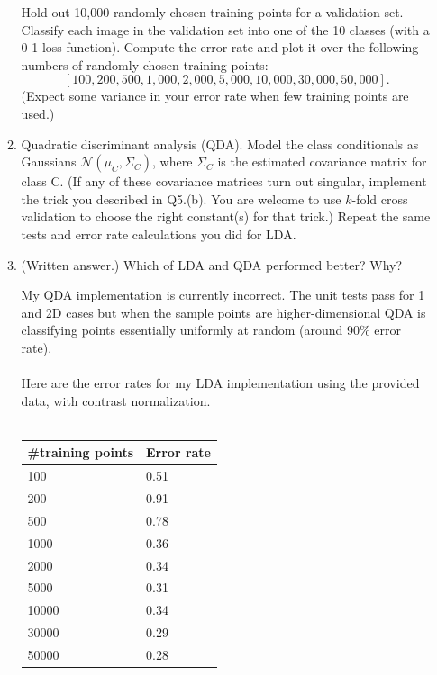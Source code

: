 \documentclass{article}
\renewcommand{\N}{\mathcal{N}}
\begin{document}
\begin{enumerate}[label=(\alph*)]
\begin{enumerate}[label=(\roman*)]
        Hold out 10,000 randomly chosen training points for a validation set. Classify each image in the validation set into one of the 10 classes (with a 0-1 loss function). Compute the error rate and plot it over the following numbers of randomly chosen training points: $$[100, 200, 500, 1,000, 2,000, 5,000, 10,000, 30,000, 50,000].$$ (Expect some variance in your error rate when few training points are used.)

        \item Quadratic discriminant analysis (QDA). Model the class conditionals as Gaussians $\N(\mu_C, \Sigma_C)$, where $\Sigma_C$ is the estimated covariance matrix for class C. (If any of these covariance matrices turn out singular, implement the trick you described in Q5.(b). You are welcome to use $k$-fold cross validation to choose the right constant(s) for that trick.) Repeat the same tests and error rate calculations you did for LDA.

        \item  (Written answer.) Which of LDA and QDA performed better? Why?
        \begin{mdframed}
          My QDA implementation is currently incorrect. The unit tests pass for
          1 and 2D cases but when the sample points are higher-dimensional QDA
          is classifying points essentially uniformly at random (around 90\%
          error rate).
          \\\\
          Here are the error rates for my LDA implementation using the provided
          data, with contrast normalization.
          \\\\
          \begin{tabular}{l|l}
            \#{training points}&Error rate\\
            \hline
            100 & 0.51\\
            200 & 0.91\\
            500 & 0.78\\
            1000 & 0.36\\
            2000 & 0.34\\
            5000 & 0.31\\
            10000 & 0.34\\
            30000 & 0.29\\
            50000 & 0.28\\
          \end{tabular}
        \end{mdframed}


\end{enumerate}
\end{enumerate}
\end{document}
